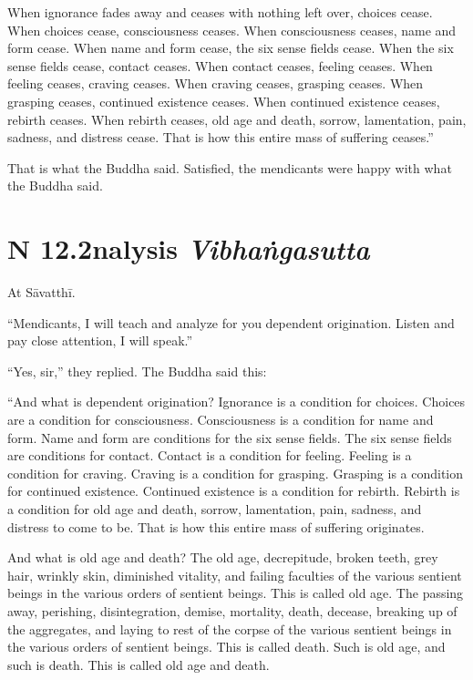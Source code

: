 \documentclass[12pt,openany]{book}%
\newcommand*{\suttatitleacronym}[1]{\smaller[2]{#1}\vspace*{.3em}}
\newcommand*{\suttatitletranslation}[1]{\linebreak{#1}}
\newcommand*{\suttatitleroot}[1]{\linebreak\smaller[2]\itshape{#1}}
\newcommand*{\tocacronym}[1]{\hspace*{-3.3em}{#1}\quad}
\newcommand*{\toctranslation}[1]{#1}
\newcommand*{\tocroot}[1]{(\textit{#1})}
\begin{document}
When ignorance fades away and ceases with nothing left over, choices cease. When choices cease, consciousness ceases. When consciousness ceases, name and form cease. When name and form cease, the six sense fields cease. When the six sense fields cease, contact ceases. When contact ceases, feeling ceases. When feeling ceases, craving ceases. When craving ceases, grasping ceases. When grasping ceases, continued existence ceases. When continued existence ceases, rebirth ceases. When rebirth ceases, old age and death, sorrow, lamentation, pain, sadness, and distress cease. That is how this entire mass of suffering ceases.” 

That is what the Buddha said. Satisfied, the mendicants were happy with what the Buddha said. 

%
\section*{{\suttatitleacronym SN 12.2}{\suttatitletranslation Analysis }{\suttatitleroot Vibhaṅgasutta}}
\addcontentsline{toc}{section}{\tocacronym{SN 12.2} \toctranslation{Analysis } \tocroot{Vibhaṅgasutta}}

At \textsanskrit{Sāvatthī}. 

“Mendicants, I will teach and analyze for you dependent origination. Listen and pay close attention, I will speak.” 

“Yes, sir,” they replied. The Buddha said this: 

“And what is dependent origination? Ignorance is a condition for choices. Choices are a condition for consciousness. Consciousness is a condition for name and form. Name and form are conditions for the six sense fields. The six sense fields are conditions for contact. Contact is a condition for feeling. Feeling is a condition for craving. Craving is a condition for grasping. Grasping is a condition for continued existence. Continued existence is a condition for rebirth. Rebirth is a condition for old age and death, sorrow, lamentation, pain, sadness, and distress to come to be. That is how this entire mass of suffering originates. 

And what is old age and death? The old age, decrepitude, broken teeth, grey hair, wrinkly skin, diminished vitality, and failing faculties of the various sentient beings in the various orders of sentient beings. This is called old age. The passing away, perishing, disintegration, demise, mortality, death, decease, breaking up of the aggregates, and laying to rest of the corpse of the various sentient beings in the various orders of sentient beings. This is called death. Such is old age, and such is death. This is called old age and death. 
\end{document}
